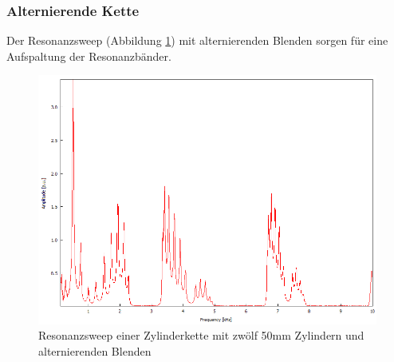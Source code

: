 \subsubsection{Alternierende Kette}
Der Resonanzsweep (Abbildung \ref{fig:zylinder_alternierend}) mit alternierenden Blenden sorgen für eine Aufspaltung der Resonanzbänder.
\begin{figure}
  \centering
  \includegraphics[width=\textwidth]{Bilder/Zylinderketten/rein_12_alternierendeBlende.png}
  \caption{Resonanzsweep einer Zylinderkette mit zwölf 50mm Zylindern und alternierenden Blenden}
  \label{fig:zylinder_alternierend}
\end{figure}

